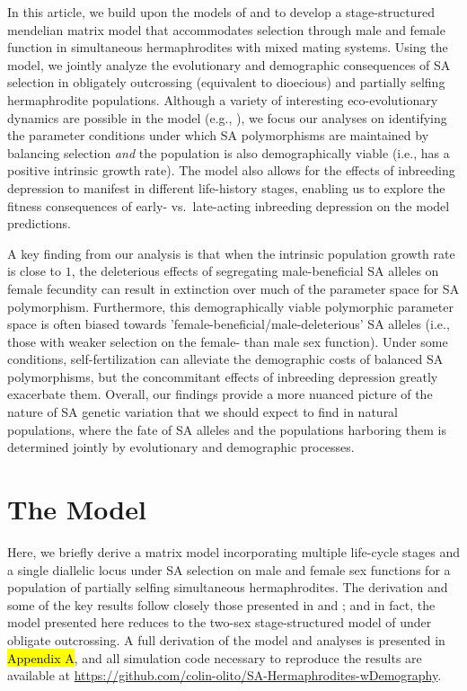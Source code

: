 \documentclass[11pt]{article}
\begin{document}
In this article, we build upon the models of \citet{deVriesCaswell2019a} and \citet{deVriesCaswell2019b} to develop a stage-structured mendelian matrix model that accommodates selection through male and female function in simultaneous hermaphrodites with mixed mating systems. Using the model, we jointly analyze the evolutionary and demographic consequences of SA selection in obligately outcrossing (equivalent to dioecious) and partially selfing hermaphrodite populations. Although a variety of interesting eco-evolutionary dynamics are possible in the model (e.g., \citealt{deVriesCaswell2019a, deVriesCaswell2019b,CaswellEtAl2018}), we focus our analyses on identifying the parameter conditions under which SA polymorphisms are maintained by balancing selection {\itshape and} the population is also demographically viable (i.e., has a positive intrinsic growth rate). The model also allows for the effects of inbreeding depression to manifest in different life-history stages, enabling us to explore the fitness consequences of early- vs.~late-acting inbreeding depression on the model predictions.

A key finding from our analysis is that when the intrinsic population growth rate is close to $1$, the deleterious effects of segregating male-beneficial SA alleles on female fecundity can result in extinction over much of the parameter space for SA polymorphism. Furthermore, this demographically viable polymorphic parameter space is often biased towards 'female-beneficial/male-deleterious' SA alleles (i.e., those with weaker selection on the female- than male sex function). Under some conditions, self-fertilization can alleviate the demographic costs of balanced SA polymorphisms, but the concommitant effects of inbreeding depression greatly exacerbate them. Overall, our findings provide a more nuanced picture of the nature of SA genetic variation that we should expect to find in natural populations, where the fate of SA alleles and the populations harboring them is determined jointly by evolutionary and demographic processes.


\section*{The Model}

Here, we briefly derive a matrix model incorporating multiple life-cycle stages and a single diallelic locus under SA selection on male and female sex functions for a population of partially selfing simultaneous hermaphrodites. The derivation and some of the key results follow closely those presented in \citet{deVriesCaswell2019a} and \citet{deVriesCaswell2019b}; and in fact, the model presented here reduces to the two-sex stage-structured model of \citet{deVriesCaswell2019b} under obligate outcrossing. A full derivation of the model and analyses is presented in \hl{Appendix A}, and all simulation code necessary to reproduce the results are available at \url{https://github.com/colin-olito/SA-Hermaphrodites-wDemography}.
\end{document}
